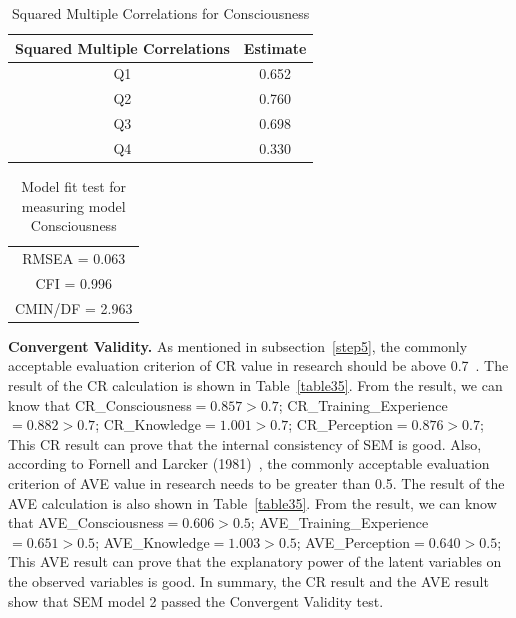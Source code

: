\begin{table}[h]
  \caption{Squared Multiple Correlations for Consciousness}
  \label{table25}
  \centering
  \begin{tabular}{c|c}
  \hline
   Squared Multiple Correlations & Estimate \\
  \hline
  Q1  & 0.652 \\
  Q2  & 0.760 \\
  Q3  & 0.698 \\
  Q4  & 0.330 \\
  \hline
  \end{tabular}
\end{table}

\begin{table}[h]
  \caption{Model fit test for measuring model Consciousness}
  \label{table26}
  \centering 
  \begin{tabular}{|c|}
  \hline
  RMSEA = 0.063 \\
  CFI = 0.996 \\
  CMIN/DF = 2.963 \\
  \hline
  \end{tabular}
\end{table}

\textbf{Convergent Validity.} As mentioned in subsection~\ref{step5}, the commonly acceptable evaluation criterion of CR value in research should be above 0.7~\cite{ref32}. The result of the CR calculation is shown in Table~\ref{table35}. From the result, we can know that CR\_Consciousness$=0.857>0.7$; CR\_Training\_Experience$=0.882>0.7$; CR\_Knowledge$=1.001>0.7$; CR\_Perception$=0.876>0.7$; This CR result can prove that the internal consistency of SEM is good. Also, according to Fornell and Larcker (1981)~\cite{ref31}, the commonly acceptable evaluation criterion of AVE value in research needs to be greater than 0.5. The result of the AVE calculation is also shown in Table~\ref{table35}. From the result, we can know that AVE\_Consciousness$=0.606>0.5$; AVE\_Training\_Experience$=0.651>0.5$; AVE\_Knowledge$=1.003>0.5$; AVE\_Perception$=0.640>0.5$; This AVE result can prove that the explanatory power of the latent variables on the observed variables is good. In summary, the CR result and the AVE result show that SEM model 2 passed the Convergent Validity test. 

